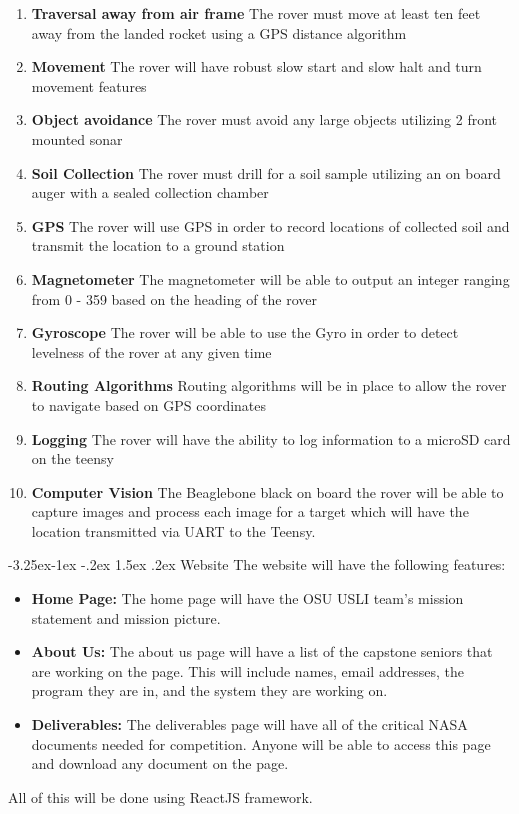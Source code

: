 \documentclass[onecolumn, draftclsnofoot, 10pt, compsoc]{IEEEtran}
\makeatletter
\renewcommand\paragraph{\@startsection{paragraph}{4}{\z@}%
                                     {-3.25ex\@plus -1ex \@minus -.2ex}%
                                     {1.5ex \@plus .2ex}%
                                     {\normalfont\normalsize\bfseries}}
\makeatother
\begin{document}
\begin{enumerate}
\item \textbf{Traversal away from air frame} The rover must move at least ten feet away from the landed rocket using a GPS distance algorithm
\item \textbf{Movement} The rover will have robust slow start and slow halt and turn movement features
\item \textbf{Object avoidance} The rover must avoid any large objects utilizing 2 front mounted sonar 
\item \textbf{Soil Collection} The rover must drill for a soil sample utilizing an on board auger with a sealed collection chamber
\item \textbf{GPS} The rover will use GPS in order to record locations of collected soil and transmit the location to a ground station
\item \textbf{Magnetometer} The magnetometer will be able to output an integer ranging from 0 - 359 based on the heading of the rover
\item \textbf{Gyroscope} The rover will be able to use the Gyro in order to detect levelness of the rover at any given time
\item \textbf{Routing Algorithms} Routing algorithms will be in place to allow the rover to navigate based on GPS coordinates
\item \textbf{Logging} The rover will have the ability to log information to a microSD card on the teensy
\item \textbf{Computer Vision} The Beaglebone black on board the rover will be able to capture images and process each image for a target which will have the location transmitted via UART to the Teensy. 
\end{enumerate}


\paragraph{Website}
The website will have the following features: 
\begin{itemize}
    \item \textbf{Home Page:} The home page will have the OSU USLI team's mission statement and mission picture. 
    \item \textbf{About Us:} The about us page will have a list of the capstone seniors that are working on the page. This will include names, email addresses, the program they are in, and the system they are working on. 
    \item \textbf{Deliverables:} The deliverables page will have all of the critical NASA documents needed for competition. Anyone will be able to access this page and download any document on the page. 
\end{itemize}
All of this will be done using ReactJS framework. 
\end{document}
